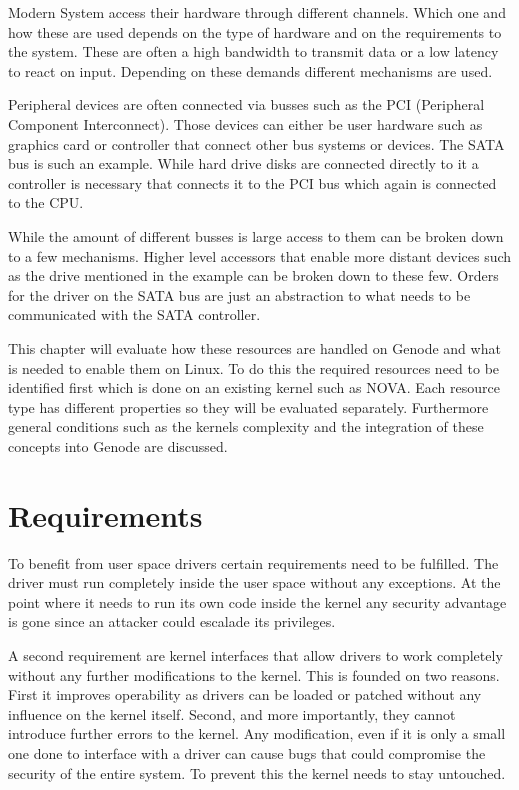 \documentclass[
a4paper,
12pt,
notitlepage,
parskip=half,
DIV=11,
]{scrbook}
\begin{document}
		Modern System access their hardware through different channels.
		Which one and how these are used depends on the type of hardware and on the requirements to the system.
		These are often a high bandwidth to transmit data or a low latency to react on input.
		Depending on these demands different mechanisms are used.
		
		Peripheral devices are often connected via busses such as the PCI (Peripheral Component Interconnect).
		Those devices can either be user hardware such as graphics card or controller that connect other bus systems or devices.
		The SATA bus is such an example.
		While hard drive disks are connected directly to it a controller is necessary that connects it to the PCI bus which again is connected to the CPU.
		
		While the amount of different busses is large access to them can be broken down to a few mechanisms.
		Higher level accessors that enable more distant devices such as the drive mentioned in the example can be broken down to these few.
		Orders for the driver on the SATA bus are just an abstraction to what needs to be communicated with the SATA controller. \citep{iosystems}
		
		This chapter will evaluate how these resources are handled on Genode and what is needed to enable them on Linux.
		To do this the required resources need to be identified first which is done on an existing kernel such as NOVA.
		Each resource type has different properties so they will be evaluated separately.
		Furthermore general conditions such as the kernels complexity and the integration of these concepts into Genode are discussed.
		
		\section{Requirements}
		
		
		To benefit from user space drivers certain requirements need to be fulfilled.
		The driver must run completely inside the user space without any exceptions.
		At the point where it needs to run its own code inside the kernel any security advantage is gone since an attacker could escalade its privileges.
		
		A second requirement are kernel interfaces that allow drivers to work completely without any further modifications to the kernel.
		This is founded on two reasons.
		First it improves operability as drivers can be loaded or patched without any influence on the kernel itself.
		Second, and more importantly, they cannot introduce further errors to the kernel.
		Any modification, even if it is only a small one done to interface with a driver can cause bugs that could compromise the security of the entire system.
		To prevent this the kernel needs to stay untouched.
		
\end{document}
